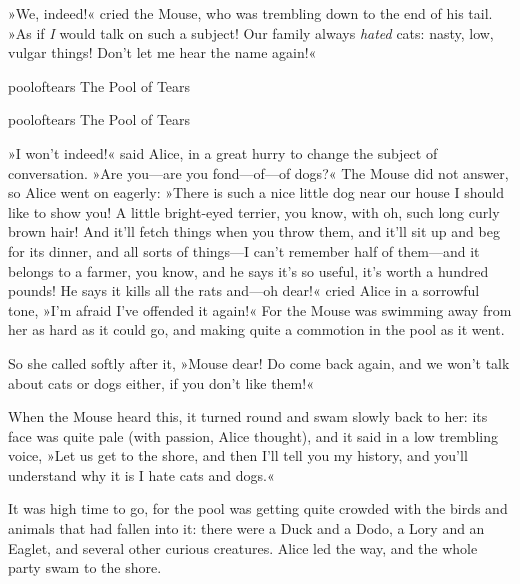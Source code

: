 »We, indeed!« cried the Mouse, who was trembling down to the end of his tail. »As if \textit{I} would talk on such a subject! Our family always \textit{hated} cats: nasty, low, vulgar things! Don't let me hear the name again!«

\begin{pictures}
	\begin{letter}
		\begin{colorbigpic}
			[1.2]
			{pooloftears}
			{The Pool of Tears}
		\end{colorbigpic}
	\end{letter}
	
	\begin{a4}
		\begin{colorbigpic}
			[1.1]
			{pooloftears}
			{The Pool of Tears}
		\end{colorbigpic}	
	\end{a4}	
\end{pictures}

»I won't indeed!« said Alice, in a great hurry to change the subject of conversation. »Are you—are you fond—of—of dogs?« The Mouse did not answer, so Alice went on eagerly: »There is such a nice little dog near our house I should like to show you! A little bright-eyed terrier, you know, with oh, such long curly brown hair! And it'll fetch things when you throw them, and it'll sit up and beg for its dinner, and all sorts of things—I can't remember half of them—and it belongs to a farmer, you know, and he says it's so useful, it's worth a hundred pounds! He says it kills all the rats and—oh dear!« cried Alice in a sorrowful tone, »I'm afraid I've offended it again!« For the Mouse was swimming away from her as hard as it could go, and making quite a commotion in the pool as it went.

So she called softly after it, »Mouse dear! Do come back again, and we won't talk about cats or dogs either, if you don't like them!«

When the Mouse heard this, it turned round and swam slowly back to her: its face was quite pale (with passion, Alice thought), and it said in a low trembling voice, »Let us get to the shore, and then I'll tell you my history, and you'll understand why it is I hate cats and dogs.«

It was high time to go, for the pool was getting quite crowded with the birds and animals that had fallen into it: there were a Duck and a Dodo, a Lory and an Eaglet, and several other curious creatures. Alice led the way, and the whole party swam to the shore.